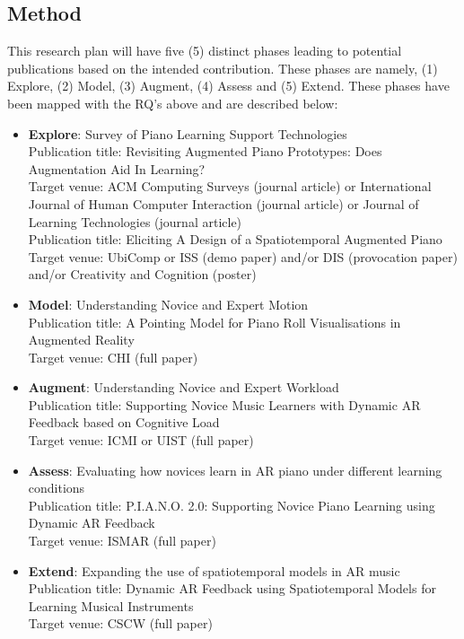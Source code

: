 \documentclass[manuscript,screen]{acmart}
\begin{document}
\subsection{Method}
This research plan will have five (5) distinct phases leading to potential publications based on the intended contribution. These phases are namely, (1) Explore, (2) Model, (3) Augment, (4) Assess and (5) Extend. These phases have been mapped with the RQ's above and are described below: 
\begin{itemize}
    \item \textbf{Explore}: Survey of Piano Learning Support Technologies\\
    Publication title: Revisiting Augmented Piano Prototypes: Does Augmentation Aid In Learning?\\
    Target venue: ACM Computing Surveys (journal article) or International Journal of Human Computer Interaction (journal article) or Journal of Learning Technologies (journal article) \\ 
    Publication title: Eliciting A Design of a Spatiotemporal Augmented Piano \\
    Target venue: UbiComp or ISS (demo paper) and/or DIS (provocation paper) and/or Creativity and Cognition (poster)
    \item \textbf{Model}: Understanding Novice and Expert Motion\\
    Publication title: A Pointing Model for Piano Roll Visualisations in Augmented Reality\\
    Target venue: CHI (full paper)
    \item \textbf{Augment}: Understanding Novice and Expert Workload\\
    Publication title: Supporting Novice Music Learners with Dynamic AR Feedback based on Cognitive Load\\
    Target venue: ICMI or UIST (full paper)
    \item \textbf{Assess}: Evaluating how novices learn in AR piano under different learning conditions\\
    Publication title: P.I.A.N.O. 2.0: Supporting Novice Piano Learning using Dynamic AR Feedback\\
    Target venue: ISMAR (full paper)
    \item \textbf{Extend}: Expanding the use of spatiotemporal models in AR music\\
    Publication title: Dynamic AR Feedback using Spatiotemporal Models for Learning Musical Instruments\\
    Target venue: CSCW (full paper)
\end{itemize}
\end{document}
